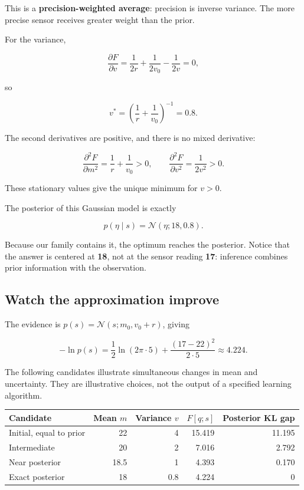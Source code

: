 \documentclass[
  letterpaper,
  DIV=11,
  numbers=noendperiod]{scrreprt}
\newcounter{none} %
\begin{document}
This is a \textbf{precision-weighted average}: precision is inverse
variance. The more precise sensor receives greater weight than the
prior.

For the variance,

\[
\frac{\partial F}{\partial v}
=\frac{1}{2r}+\frac{1}{2v_0}-\frac{1}{2v}=0,
\]

so

\[
v^*=\left(\frac1r+\frac1{v_0}\right)^{-1}=0.8.
\]

The second derivatives are positive, and there is no mixed derivative:

\[
\frac{\partial^2F}{\partial m^2}=\frac1r+\frac1{v_0}>0,
\qquad
\frac{\partial^2F}{\partial v^2}=\frac{1}{2v^2}>0.
\]

These stationary values give the unique minimum for \(v>0\).

The posterior of this Gaussian model is exactly

\[
p(\eta\mid s)=\mathcal N(\eta;18,0.8).
\]

Because our family contains it, the optimum reaches the posterior.
Notice that the answer is centered at \textbf{18}, not at the sensor
reading \textbf{17}: inference combines prior information with the
observation.

\subsection{Watch the approximation
improve}\label{watch-the-approximation-improve}

The evidence is \(p(s)=\mathcal N(s;m_0,v_0+r)\), giving

\[
-\ln p(s)=\frac12\ln(2\pi\cdot5)+\frac{(17-22)^2}{2\cdot5}
\approx4.224.
\]

The following candidates illustrate simultaneous changes in mean and
uncertainty. They are illustrative choices, not the output of a
specified learning algorithm.

{\def\LTcaptype{none} %
\begin{longtable}[]{@{}lrrrr@{}}
\toprule\noalign{}
Candidate & Mean \(m\) & Variance \(v\) & \(F[q;s]\) & Posterior KL
gap \\
\midrule\noalign{}
\endhead
\bottomrule\noalign{}
\endlastfoot
Initial, equal to prior & 22 & 4 & 15.419 & 11.195 \\
Intermediate & 20 & 2 & 7.016 & 2.792 \\
Near posterior & 18.5 & 1 & 4.393 & 0.170 \\
Exact posterior & 18 & 0.8 & 4.224 & 0 \\
\end{longtable}
}
\end{document}
